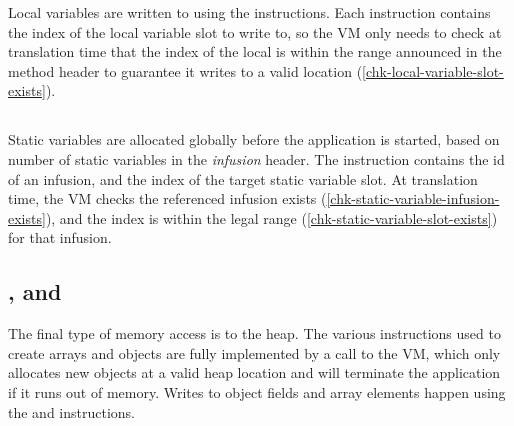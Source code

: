 Local variables are written to using the  instructions. Each  instruction contains the index of the local variable slot to write to, so the VM only needs to check at translation time that the index of the local is within the range announced in the method header to guarantee it writes to a valid location (\ref{chk-local-variable-slot-exists}).

\subsection{}
Static variables are allocated globally before the application is started, based on number of static variables in the \emph{infusion} header. The  instruction contains the id of an infusion, and the index of the target static variable slot. At translation time, the VM checks the referenced infusion exists (\ref{chk-static-variable-infusion-exists}), and the index is within the legal range (\ref{chk-static-variable-slot-exists}) for that infusion.

\subsection{,  and }
\label{sec-safety-heap-access}




The final type of memory access is to the heap. The various  instructions used to create arrays and objects are fully implemented by a call to the VM, which only allocates new objects at a valid heap location and will terminate the application if it runs out of memory. Writes to object fields and array elements happen using the  and  instructions.

